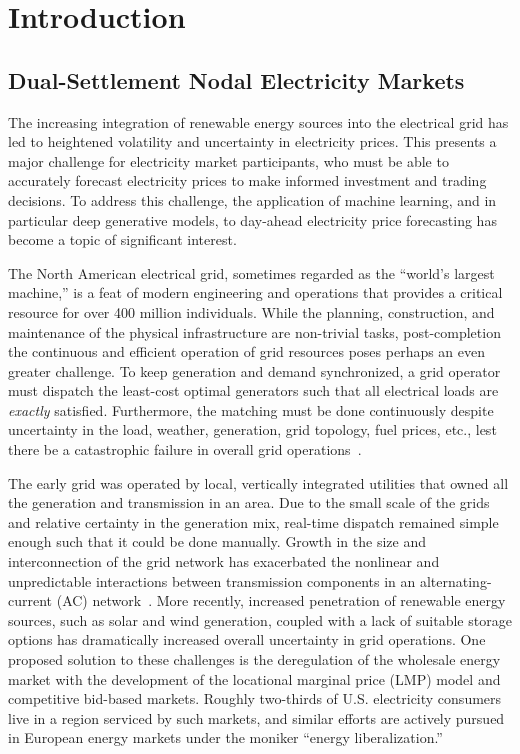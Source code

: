 \chapter{Introduction}\label{ch:intro}

\section{Dual-Settlement Nodal Electricity Markets}\label{sec:dual-settlement-nodal-electricity-markets}

The increasing integration of renewable energy sources into the electrical grid has led to heightened volatility and
uncertainty in electricity prices.
This presents a major challenge for electricity market participants, who must be able
to accurately forecast electricity prices to make informed investment and trading decisions.
To address this challenge, the application of machine learning, and in particular deep generative models, to
day-ahead electricity price forecasting has become a topic of significant interest.

The North American electrical grid, sometimes regarded as the ``world's largest machine,'' is a feat of modern
engineering and operations that provides a critical resource for over 400 million individuals.
While the planning, construction, and maintenance of the physical infrastructure are non-trivial tasks,
post-completion the continuous and efficient operation of grid resources poses perhaps an even greater challenge.
To keep generation and demand synchronized, a grid operator must dispatch the least-cost optimal
generators such that all electrical loads are \textit{exactly} satisfied.
Furthermore, the matching must be done continuously despite uncertainty in the load, weather, generation,
grid topology, fuel prices, etc., lest there be a catastrophic failure in overall grid operations~\cite{ercotfail}.

The early grid was operated by local, vertically integrated utilities that owned all the generation and transmission in
an area.
Due to the small scale of the grids and relative certainty in the generation mix, real-time dispatch remained simple
enough such that it could be done manually.
Growth in the size and interconnection of the grid network has exacerbated the nonlinear and unpredictable interactions
between transmission components in an alternating-current (AC) network~\cite{grid_sensitivity}.
More recently, increased penetration of renewable energy sources, such as solar and wind generation, coupled
with a lack of suitable storage options has dramatically increased overall uncertainty in grid operations.
One proposed solution to these challenges is the deregulation of the wholesale energy market with the development of
the locational marginal price (LMP) model and competitive bid-based markets.
Roughly two-thirds of U.S. electricity consumers live in a region serviced by such markets, and similar efforts are
actively pursued in European energy markets under the moniker ``energy liberalization.''

